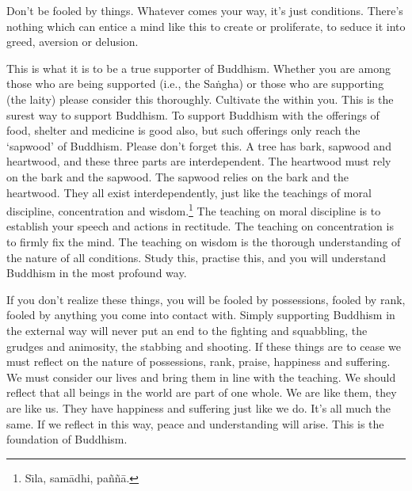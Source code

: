 Don't be fooled by things. Whatever comes your way, it's just conditions. There's nothing which can entice a mind like this to create or proliferate, to seduce it into greed, aversion or delusion.

This is what it is to be a true supporter of Buddhism. Whether you are among those who are being supported (i.e., the Sa\.ngha) or those who are supporting (the laity) please consider this thoroughly. Cultivate the  within you. This is the surest way to support Buddhism. To support Buddhism with the offerings of food, shelter and medicine is good also, but such offerings only reach the `sapwood' of Buddhism. Please don't forget this. A tree has bark, sapwood and heartwood, and these three parts are interdependent. The heartwood must rely on the bark and the sapwood. The sapwood relies on the bark and the heartwood. They all exist interdependently, just like the teachings of moral discipline, concentration and wisdom.\footnote{S\={\i}la, sam\=adhi, pa\~n\~n\=a.} The teaching on moral discipline is to establish your speech and actions in rectitude. The teaching on concentration is to firmly fix the mind. The teaching on wisdom is the thorough understanding of the nature of all conditions. Study this, practise this, and you will understand Buddhism in the most profound way.

If you don't realize these things, you will be fooled by possessions, fooled by rank, fooled by anything you come into contact with. Simply supporting Buddhism in the external way will never put an end to the fighting and squabbling, the grudges and animosity, the stabbing and shooting. If these things are to cease we must reflect on the nature of possessions, rank, praise, happiness and suffering. We must consider our lives and bring them in line with the teaching. We should reflect that all beings in the world are part of one whole. We are like them, they are like us. They have happiness and suffering just like we do. It's all much the same. If we reflect in this way, peace and understanding will arise. This is the foundation of Buddhism.

